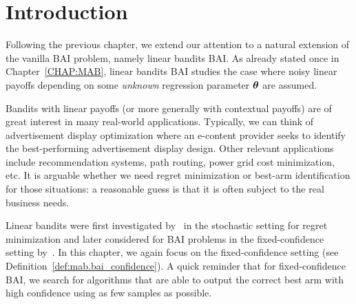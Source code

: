 \section{Introduction}\label{sec:lgc.intro}


Following the previous chapter, we extend our attention to a natural extension of the vanilla BAI problem, namely linear bandits BAI. As already stated once in Chapter~\ref{CHAP:MAB}, linear bandits BAI studies the case where noisy linear payoffs depending on some \emph{unknown} regression parameter ${\boldsymbol \theta}$ are assumed.

Bandits with linear payoffs (or more generally with contextual payoffs) are of great interest in many real-world applications. Typically, we can think of advertisement display optimization where an e-content provider seeks to identify the best-performing advertisement display design. Other relevant applications include recommendation systems, path routing, power grid cost minimization, etc. It is arguable whether we need regret minimization or best-arm identification for those situations: a reasonable guess is that it is often subject to the real business needs.

Linear bandits were first investigated by~\citet{auer2002linear} in the stochastic setting for regret minimization and later considered for BAI problems in the fixed-confidence setting by~\citet{soare2014linear}. In this chapter, we again focus on the fixed-confidence setting (see Definition~\ref{def:mab.bai_confidence}). A quick reminder that for fixed-confidence BAI, we search for algorithms that are able to output the correct best arm with high confidence using as few samples as possible.


